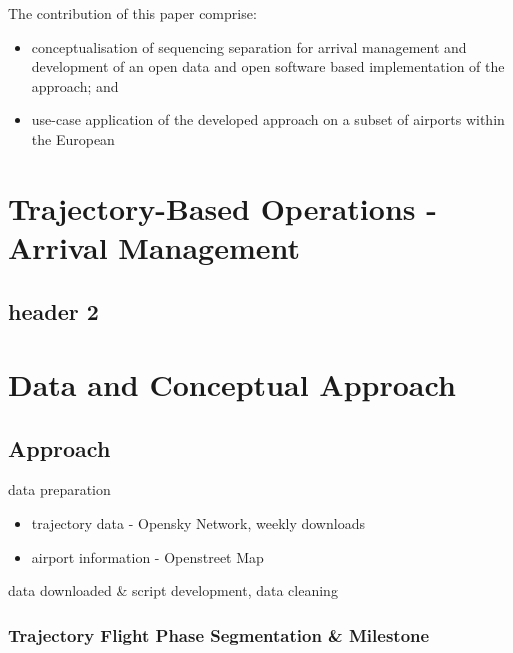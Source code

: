 \documentclass[letterpaper, 10 pt, journal, twoside]{IEEEtran}
\providecommand{\tightlist}{%
  \setlength{\itemsep}{0pt}\setlength{\parskip}{0pt}}\usepackage{longtable,booktabs,array}
\begin{document}
The contribution of this paper comprise:

\begin{itemize}
\item
  conceptualisation of sequencing separation for arrival management and
  development of an open data and open software based implementation of
  the approach; and
\item
  use-case application of the developed approach on a subset of airports
  within the European
\end{itemize}

\hypertarget{trajectory-based-operations---arrival-management}{%
\section{Trajectory-Based Operations - Arrival
Management}\label{trajectory-based-operations---arrival-management}}

\hypertarget{header-2}{%
\subsection{header 2}\label{header-2}}

\hypertarget{data-and-conceptual-approach}{%
\section{Data and Conceptual
Approach}\label{data-and-conceptual-approach}}

\hypertarget{approach}{%
\subsection{Approach}\label{approach}}

data preparation

\begin{itemize}
\tightlist
\item
  trajectory data - Opensky Network, weekly downloads
\item
  airport information - Openstreet Map
\end{itemize}

data downloaded \& script development, data cleaning

\hypertarget{trajectory-flight-phase-segmentation-milestone}{%
\subsubsection{Trajectory Flight Phase Segmentation \&
Milestone}\label{trajectory-flight-phase-segmentation-milestone}}
\end{document}
